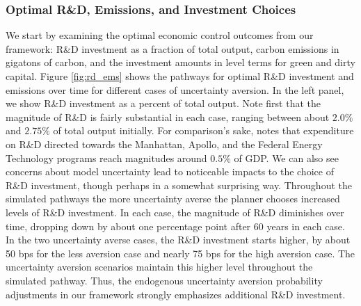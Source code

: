 \documentclass[12pt]{article}
\begin{document}


\subsubsection{Optimal R\&D, Emissions, and Investment Choices}

We start by examining the optimal economic control outcomes from our framework: R\&D investment as a fraction of total output, carbon emissions in gigatons of carbon, and the investment amounts in level terms for green and dirty capital. Figure \ref{fig:rd_ems} shows the pathways for optimal R\&D investment and emissions over time for different cases of uncertainty aversion. In the left panel, we show R\&D investment as a percent of total output. Note first that the magnitude of R\&D is fairly substantial in each case, ranging between about $2.0\%$ and $2.75\%$ of total output initially. For comparison's sake, \cite{stine2008manhattan} notes that expenditure on R\&D directed towards the Manhattan, Apollo, and the Federal Energy Technology programs reach magnitudes around $0.5\%$ of GDP. We can also see concerns about model uncertainty lead to noticeable impacts to the choice of R\&D investment, though perhaps in a somewhat surprising way. Throughout the simulated pathways the more uncertainty averse the planner chooses increased levels of R\&D investment. In each case, the magnitude of R\&D diminishes over time, dropping down by about one percentage point after 60 years in each case. In the two uncertainty averse cases, the R\&D investment starts higher, by about 50 bps for the less aversion case and nearly 75 bps for the high aversion case. The uncertainty aversion scenarios maintain this higher level throughout the simulated pathway. Thus, the endogenous uncertainty aversion probability adjustments in our framework strongly emphasizes additional R\&D investment.
\end{document}
